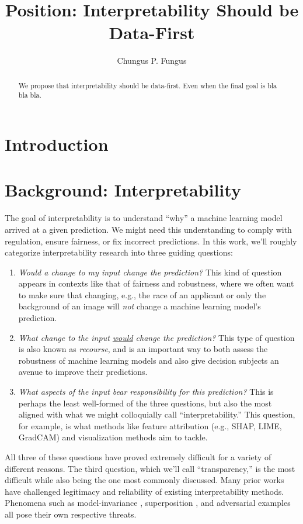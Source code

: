 \documentclass{article}
\title{Position: Interpretability Should be Data-First}
\author{Chungus P. Fungus}
\begin{document}
\maketitle
\begin{abstract}
    We propose that interpretability should be data-first.
    Even when the final goal is bla bla bla.
\end{abstract}

\section{Introduction}

\section{Background: Interpretability}
The goal of interpretability is to understand ``why'' a
machine learning model arrived at a given prediction.
We might need this understanding
to comply with regulation,
ensure fairness, 
or fix incorrect predictions.
In this work, we'll roughly categorize interpretability research 
into three guiding questions:
\begin{enumerate}
    \item {\em Would a \underline{} change to my input change the prediction?}
    This kind of question appears in contexts like that of fairness and robustness, 
    where we often want to make sure that changing, e.g., the race of
    an applicant \citep{TODO} or only the background of an image 
    \citep{xiao2021noise} will {\em not} change a machine learning model's prediction.
    \item {\em What change to the input \underline{would} change the prediction?} 
    This type of question is also known as {\em recourse},
    and is an important way to both assess the robustness of machine learning models
    and also give decision subjects an avenue to improve their predictions.
    \item {\em What aspects of the input bear responsibility for this prediction?}
    This is perhaps the least well-formed of the three questions, 
    but also the most aligned with what we might colloquially call ``interpretability.''
    This question, for example, is what methods like feature attribution 
    (e.g., SHAP, LIME, GradCAM) and visualization methods aim to tackle.
\end{enumerate}
All three of these questions have proved extremely difficult for a 
variety of different reasons.
The third question, which we'll call ``transparency,'' 
is the most difficult while also being the one most commonly discussed.
Many prior works have challenged legitimacy and reliability of existing
interpretability methods.
Phenomena such as model-invariance \citep{sanitychecks},
superposition \citep{superposition},
and adversarial examples \citep{adversarialexamples}
all pose their own respective threats.
\end{document}
